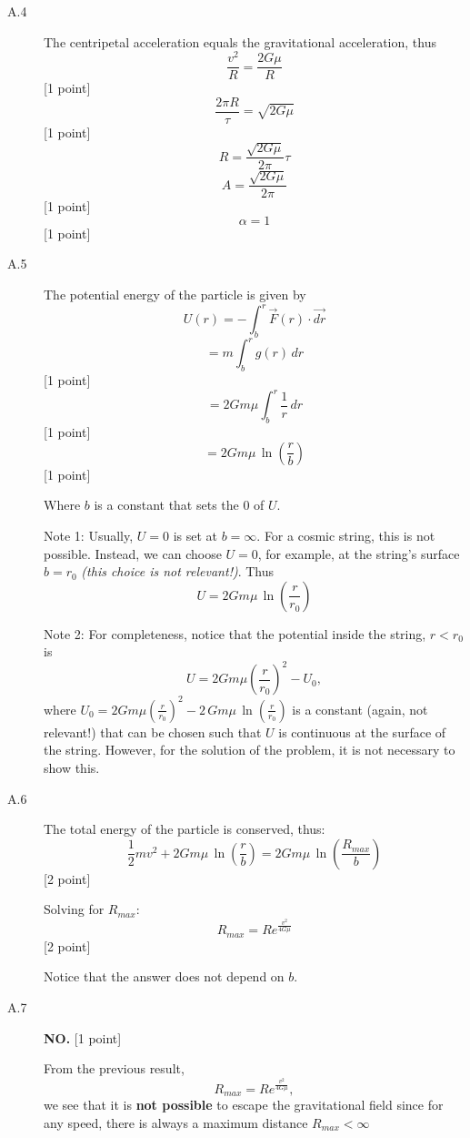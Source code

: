 \begin{description}
\item[A.4] The centripetal acceleration equals the gravitational
  acceleration, thus
  \[ \frac{v^2}{R} = \frac{2G\mu}{R} \]
  \hfill[1 point]
  \[ \frac{2\pi R}{\tau} = \sqrt{2G\mu} \]
  \hfill[1 point]
  \[ R = \frac{\sqrt{2G\mu}}{2\pi}\tau \]
  \[ A = \frac{\sqrt{2G\mu}}{2\pi} \]
  \hfill[1 point]
  \[ \alpha = 1 \]
  \hfill[1 point]

\item[A.5] The potential energy of the particle is given by
  \[ U(r) = -\int_b^r \vec{F}(r)\cdot\vec{dr} \]
  \[ = m\int_b^r g(r)\,dr \]
  \hfill[1 point]
  \[ = 2Gm\mu\int_b^r \frac{1}{r}\,dr \]
  \hfill[1 point]
  \[ = 2Gm\mu\,\ln\!\left(\frac{r}{b}\right) \]
  \hfill[1 point]

  Where $b$ is a constant that sets the 0 of $U$.

  Note 1: Usually, $U = 0$ is set at $b = \infty$. For a cosmic string,
  this is not possible. Instead, we can choose $U = 0$, for example, at
  the string's surface $b = r_0$ \emph{(this choice is not relevant!)}.
  Thus
  \[ U = 2Gm\mu\,\ln\!\left(\frac{r}{r_0}\right) \]

  Note 2: For completeness, notice that the potential inside the string,
  $r < r_0$ is
  \[ U = 2Gm\mu\left(\frac{r}{r_0}\right)^2 - U_0, \]
  where
  $U_0 = 2Gm\mu\left(\frac{r}{r_0}\right)^2
   - 2\,Gm\mu\,\ln\!\left(\frac{r}{r_0}\right)$
  is a constant (again, not relevant!) that can be chosen such that $U$
  is continuous at the surface of the string. However, for the solution
  of the problem, it is not necessary to show this.

\item[A.6] The total energy of the particle is conserved, thus:
  \[ \frac{1}{2}mv^2 + 2Gm\mu\,\ln\!\left(\frac{r}{b}\right)
     = 2Gm\mu\,\ln\!\left(\frac{R_{max}}{b}\right) \]
  \hfill[2 point]

  Solving for $R_{max}$:
  \[ R_{max} = Re^{\frac{v^2}{4G\mu}} \]
  \hfill[2 point]

  Notice that the answer does not depend on $b$.

\item[A.7] \textbf{NO.} \hfill[1 point]

  From the previous result,
  \[ R_{max} = Re^{\frac{v^2}{4G\mu}}, \]
  we see that it is \textbf{not possible} to escape the gravitational
  field since for any speed, there is always a maximum distance
  $R_{max} < \infty$
\end{description}


